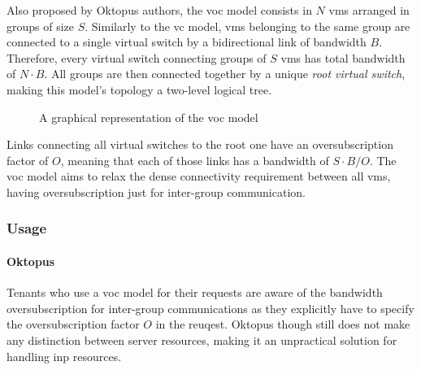 
Also proposed by Oktopus \cite{oktopus} authors, the \gls{voc} model consists in $N$ \glspl{vm} arranged in groups of size $S$.
Similarly to the \gls{vc} model, \glspl{vm} belonging to the same group are connected to a single virtual switch by a bidirectional link of bandwidth $B$.
Therefore, every virtual switch connecting groups of $S$ \glspl{vm} has total bandwidth of $N \cdot B$.
All groups are then connected together by a unique \textit{root virtual switch}, making this model's topology a two-level logical tree.

\begin{figure}[!htb]
    \centering
    \usebox{\vocfigure}
    \caption{A graphical representation of the \gls{voc} model}
\end{figure}

Links connecting all virtual switches to the root one have an oversubscription factor of $O$, meaning that each of those links has a bandwidth of $S \cdot B / O$.
The \gls{voc} model aims to relax the dense connectivity requirement between all \glspl{vm}, having oversubscription just for inter-group communication.

\subsubsection{Usage}
\paragraph{Oktopus \texorpdfstring{\cite{oktopus}}{}}
Tenants who use a \gls{voc} model for their requests are aware of the bandwidth oversubscription for inter-group communications as they explicitly have to specify the oversubscription factor $O$ in the reuqest.
Oktopus \cite{oktopus} though still does not make any distinction between server resources, making it an unpractical solution for handling \gls{inp} resources.